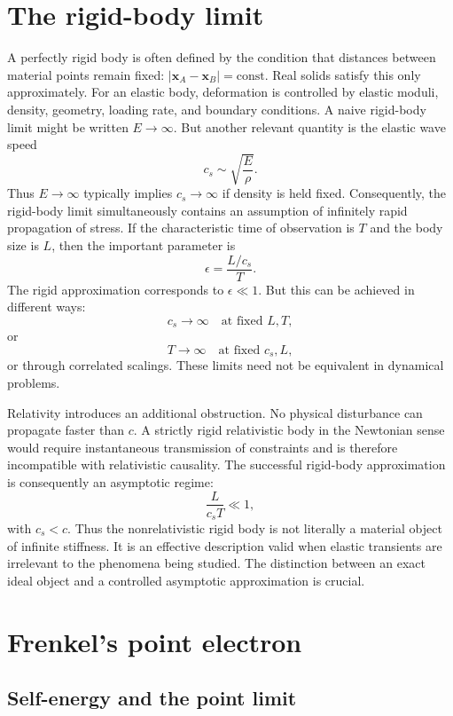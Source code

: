 \section{ The rigid-body limit}
\label{limits:rb}
A perfectly rigid body is often defined by the condition that distances between
material points remain fixed:
$|\mathbf{x}_A-\mathbf{x}_B|=\mathrm{const}$.
Real solids satisfy this only approximately.
For an elastic body, deformation is controlled by elastic moduli, density,
geometry, loading rate, and boundary conditions. A naive rigid-body limit might
be written $E\rightarrow\infty$.
But another relevant quantity is the elastic wave speed 
\[c_s\sim\sqrt{\frac{E}{\rho}}.\]
Thus $E\rightarrow\infty$ typically implies $c_s\rightarrow\infty$
if density is held fixed.
Consequently, the rigid-body limit simultaneously contains an assumption of
infinitely rapid propagation of stress.
If the characteristic time of observation is $T$ and the body size is $L$, 
then the important parameter is
\[\epsilon=\frac{L/c_s}{T}.\]
The rigid approximation corresponds to $\epsilon\ll 1$.
But this can be achieved in different ways:
\[c_s\rightarrow\infty\quad\text{at fixed }L,T,\]
or
\[T\rightarrow\infty\quad\text{at fixed }c_s,L,\]
or through correlated scalings.
These limits need not be equivalent in dynamical problems.

Relativity introduces an additional obstruction. No physical disturbance can 
propagate faster than $c$.
A strictly rigid relativistic body in the Newtonian sense would require
instantaneous transmission of constraints and is therefore incompatible with
relativistic causality.
The successful rigid-body approximation is consequently an asymptotic regime:
\[\frac{L}{c_s T}\ll 1,\]
with $c_s<c$.
Thus the nonrelativistic rigid body is not literally a material object of
infinite stiffness. It is an effective description valid when elastic
transients are irrelevant to the phenomena being studied.
The distinction between an exact ideal object and a controlled asymptotic
approximation is crucial.

\section{Frenkel's point electron}
\label{limits:frenkel}
\subsection{Self-energy and the point limit}

